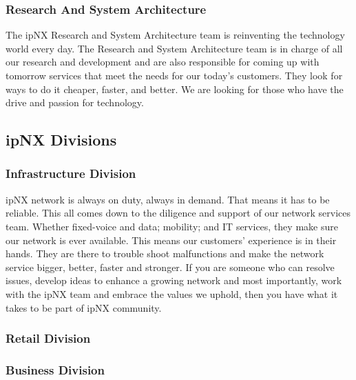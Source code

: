 \subsubsection{Research And System Architecture}
The ipNX Research and System Architecture team is reinventing the technology world every day. The Research and System Architecture team is in charge of all our research and development and are also responsible for coming up with tomorrow services that meet the needs for our today’s customers. They look for ways to do it cheaper, faster, and better. We are looking for those who have the drive and passion for technology.
\subsection{ipNX Divisions}
\subsubsection{Infrastructure Division}
ipNX network is always on duty, always in demand. That means it has to be reliable. This all comes down to the diligence and support of our network services team.  Whether fixed-voice and data; mobility; and IT services, they make sure our network is ever available. This means our customers’ experience is in their hands. They are there to trouble shoot malfunctions and make the network service bigger, better, faster and stronger. If you are someone who can resolve issues, develop ideas to enhance a growing network and most importantly, work with the ipNX team and embrace the values we uphold, then you have what it takes to be part of ipNX community.
\subsubsection{Retail Division}
\subsubsection{Business Division}